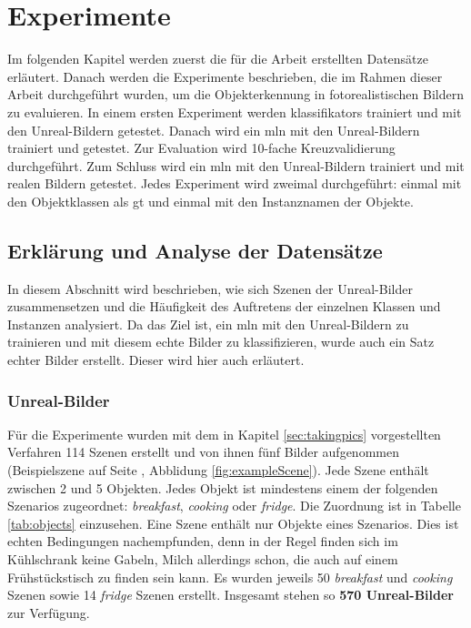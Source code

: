 \graphicspath{{./images/}}      
\def\CHAPTERONE{./chapters/Chapter-1} 

\chapter{Experimente}
\label{chap:experiments}
%	
\glsresetall
Im folgenden Kapitel werden zuerst die für die Arbeit erstellten Datensätze erläutert. Danach werden die Experimente beschrieben, die im Rahmen dieser Arbeit durchgeführt wurden, um die Objekterkennung in fotorealistischen Bildern zu evaluieren. \newline
In einem ersten Experiment werden \glspl{klassifikator} trainiert und mit den Unreal-Bildern getestet. Danach wird ein \gls{mln} mit den Unreal-Bildern trainiert und getestet. Zur Evaluation wird 10-fache Kreuzvalidierung durchgeführt. Zum Schluss wird ein \gls{mln} mit den Unreal-Bildern trainiert und mit realen Bildern getestet. Jedes Experiment wird zweimal durchgeführt: einmal mit den Objektklassen als \gls{gt} und einmal mit den Instanznamen der Objekte. 

\section{Erklärung und Analyse der Datensätze}

In diesem Abschnitt wird beschrieben, wie sich Szenen der Unreal-Bilder zusammensetzen und die Häufigkeit des Auftretens der einzelnen Klassen und Instanzen analysiert. Da das Ziel ist, ein \gls{mln} mit den Unreal-Bildern zu trainieren und mit diesem echte Bilder zu klassifizieren, wurde auch ein Satz echter Bilder erstellt. Dieser wird hier auch erläutert.

\subsection{Unreal-Bilder}  
Für die Experimente wurden mit dem in Kapitel \ref{sec:takingpics} vorgestellten Verfahren 114 Szenen erstellt und von ihnen fünf Bilder aufgenommen (Beispielszene auf Seite \pageref{fig:exampleScene}, Abblidung \ref{fig:exampleScene}). Jede Szene enthält zwischen 2 und 5 Objekten. Jedes Objekt ist mindestens einem der folgenden Szenarios zugeordnet: \textit{breakfast}, \textit{cooking} oder \textit{fridge}. Die Zuordnung ist in Tabelle \ref{tab:objects} einzusehen. Eine Szene enthält nur Objekte eines Szenarios. Dies ist echten Bedingungen nachempfunden, denn in der Regel finden sich im Kühlschrank keine Gabeln, Milch allerdings schon, die auch auf einem Frühstückstisch zu finden sein kann. Es wurden jeweils 50 \textit{breakfast} und \textit{cooking} Szenen sowie 14 \textit{fridge} Szenen erstellt. Insgesamt stehen so \textbf{570 Unreal-Bilder} zur Verfügung. \par

